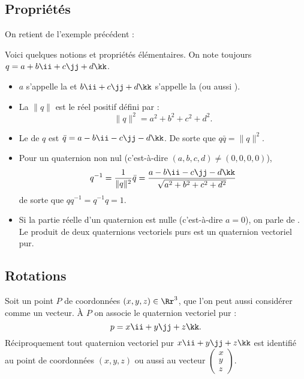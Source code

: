 \documentclass[11pt,class=report,crop=false]{standalone}
\begin{document}
\subsection{Propriétés}

On retient de l'exemple précédent :

Voici quelques notions et propriétés élémentaires. On note toujours $q = a + b\ii +c\jj +d\kk$.

\begin{itemize}
  \item $a$ s'appelle la  et $b\ii +c\jj +d\kk$ s'appelle la  (ou aussi ).

  \item La  $\|q\|$ est le réel positif défini par :
  $$\|q\|^2 = a^2 + b^2 +c^2 +d^2.$$

  \item Le  de $q$ est $\bar q =  a - b\ii -c\jj -d\kk$. De sorte que $q \bar q = \|q\|^2$.

  \item Pour un quaternion non nul (c'est-à-dire $(a,b,c,d) \neq (0,0,0,0)$), $$q^{-1} = \frac{1}{\|q\|^2} \bar q = \frac{a - b\ii -c\jj -d\kk}{\sqrt{a^2+b^2+c^2+d^2}}$$
  de sorte que $q q^{-1} = q^{-1}q = 1$.

  \item   Si la partie réelle d'un quaternion est nulle (c'est-à-dire $a=0$), on parle de . Le produit de deux quaternions vectoriels purs est un quaternion vectoriel pur.
\end{itemize}


\subsection{Rotations}

Soit un point $P$ de coordonnées $(x,y,z) \in \Rr^3$, que l'on peut aussi considérer comme un vecteur. À $P$ on associe le quaternion vectoriel pur :
$$p = x\ii + y\jj + z\kk.$$
Réciproquement tout quaternion vectoriel pur $x\ii + y\jj + z\kk$ est identifié au point de coordonnées $(x,y,z)$ ou aussi au vecteur $\left(\begin{smallmatrix}x\\y\\z\end{smallmatrix}\right)$.
\end{document}
